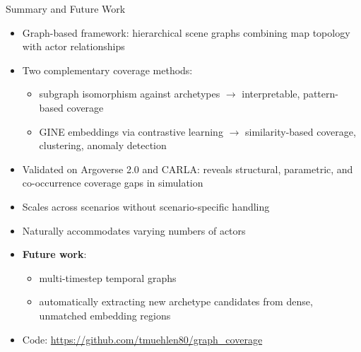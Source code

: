 \documentclass[aspectratio=169]{beamer}
\begin{document}
\begin{frame}{Summary and Future Work}
\begin{itemize}
    \footnotesize
    \item Graph-based framework: hierarchical scene graphs combining map topology with actor relationships
    \item Two complementary coverage methods:
    \begin{itemize}
        \item subgraph isomorphism against archetypes $\rightarrow$ interpretable, pattern-based coverage
        \item GINE embeddings via contrastive learning $\rightarrow$ similarity-based coverage, clustering, anomaly detection
    \end{itemize}
    \item Validated on Argoverse 2.0 and CARLA: reveals structural, parametric, and co-occurrence coverage gaps in simulation
    \item Scales across scenarios without scenario-specific handling
    \item Naturally accommodates varying numbers of actors
    \item \textbf{Future work}:
    \begin{itemize}
        \item multi-timestep temporal graphs
        \item automatically extracting new archetype candidates from dense, unmatched embedding regions
    \end{itemize}
    \item Code: \url{https://github.com/tmuehlen80/graph_coverage}
\end{itemize}
\end{frame}
\end{document}
